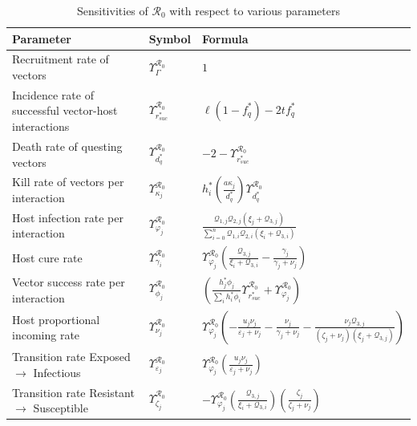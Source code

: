 \documentclass[a4paper]{article}
\newcommand{\kVar }{\kappa }
\newcommand{\biVar }{h_{i} }
\newcommand{\varpiVar}{r_{suc}}
\newcommand{\hatmuVar}{d_q}
\newcommand{\mVar}{\varphi}
\begin{document}
\begin{table}[htbp]
\caption{Sensitivities of $\mathcal{R}_0$ with respect to various parameters}\label{tab.tabvd3}
\begin{tabular}{p{8.5cm}p{1.3cm}p{5.8cm}}
\hline
Parameter & Symbol &  Formula   \\
\hline
Recruitment rate of vectors&$\varUpsilon_{\Gamma}^{\mathcal R_0}$ & $1$\\
Incidence rate of successful vector-host interactions& $\varUpsilon_{\varpiVar^*}^{\mathcal R_0}$ &  $\ell (1-f_q^*) - 2tf_q^*$\\
Death rate of questing vectors&
$\varUpsilon_{\hatmuVar^*}^{\mathcal R_0}$  &  $-2 - \varUpsilon_{\varpiVar^*}^{{\mathcal R}_0}$\\
 Kill rate of vectors per interaction&  $\varUpsilon_{\kVar_j }^{{\mathcal R}_0}$ &
$\biVar ^*\left(\frac{ a \kVar_j  }{\hatmuVar^*}\right)\varUpsilon_{\hatmuVar^*}^{{\mathcal R}_0}$\\
Host infection rate per interaction & $\varUpsilon_{\mVar_j}^{\mathcal R_0}$ &  $\frac{\mathcal{Q}_{1,j}\mathcal{Q}_{2,j} \left(\xi_j + \mathcal{Q}_{3,j} \right) }{\sum_{i=0}^n \mathcal{Q}_{1,i} \mathcal{Q}_{2,i} \left(\xi_i + \mathcal{Q}_{3,i} \right) }$ \\
Host cure rate& $\varUpsilon_{\gamma_i}^{\mathcal R_0}$ &  $\varUpsilon_{\mVar_j }^{{\mathcal R}_0}\left(\frac{\mathcal{Q}_{3,j} }{\xi_i + \mathcal{Q}_{3,i} } -\frac{\gamma_j}{\gamma_j+\nu_j }\right)$\\
Vector success rate per interaction& $\varUpsilon_{\phi_{j} }^{{\mathcal R}_0} $ &   $\left(\frac{ h_{j} ^*\phi_{j} }{\sum_i  \biVar ^* \phi_{i} }\varUpsilon_{\varpiVar^*}^{{\mathcal R}_0} + \varUpsilon_{\mVar_j }^{{\mathcal R}_0} \right)$ \\
Host proportional incoming rate& $\varUpsilon_{\nu_j}^{\mathcal R_0}$ & $\varUpsilon_{\mVar_j }^{{\mathcal R}_0}\left(  -\frac{u_j\nu_j}{\varepsilon_j + \nu_j} -\frac{\nu_j}{\gamma_j + \nu_j} -\frac{\nu_j\mathcal{Q}_{3,j}}{(\zeta_j + \nu_j)(\xi_j + \mathcal{Q}_{3,j})} \right)$\\
Transition rate Exposed $\rightarrow$ Infectious &$\varUpsilon_{\varepsilon_j}^{\mathcal R_0}$&   $\varUpsilon_{\mVar_j }^{{\mathcal R}_0}\left( \frac{u_j\nu_j}{\varepsilon_j + \nu_j}\right)$\\
Transition rate Resistant $\rightarrow$ Susceptible &$\varUpsilon_{\zeta_j}^{\mathcal R_0}$ & $- \varUpsilon_{\mVar_j }^{{\mathcal R}_0}\left(\frac{\mathcal{Q}_{3,j} }{\xi_i + \mathcal{Q}_{3,i} }\right)\left(\frac{\zeta_j}{\zeta_j + \nu_j}\right)$\\
\hline
\end{tabular}
\end{table}
\end{document}
